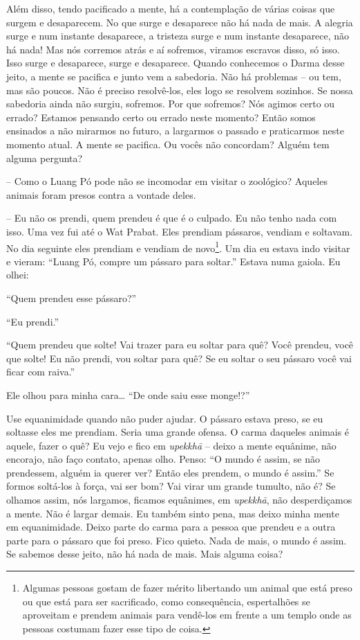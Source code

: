 Além disso, tendo pacificado a mente, há a contemplação de várias
coisas que surgem e desaparecem. No que surge e desaparece não há nada
de mais. A alegria surge e num instante desaparece, a tristeza surge e
num instante desaparece, não há nada! Mas nós corremos atrás e aí
sofremos, viramos escravos disso, só isso. Isso surge e desaparece,
surge e desaparece. Quando conhecemos o Darma desse jeito, a mente se
pacifica e junto vem a sabedoria. Não há problemas – ou tem, mas são
poucos. Não é preciso resolvê-los, eles logo se resolvem sozinhos. Se
nossa sabedoria ainda não surgiu, sofremos. Por que sofremos? Nós
agimos certo ou errado? Estamos pensando certo ou errado neste momento?
Então somos ensinados a não mirarmos no futuro, a largarmos o passado e
praticarmos neste momento atual. A mente se pacifica. Ou vocês não
concordam? Alguém tem alguma pergunta?

-- Como o Luang Pó pode não se incomodar em visitar o zoológico?
Aqueles animais foram presos contra a vontade deles.

-- Eu não os prendi, quem prendeu é que é o culpado. Eu não tenho
nada com isso. Uma vez fui até o Wat Prabat. Eles prendiam pássaros,
vendiam e soltavam. No dia seguinte eles prendiam e vendiam de
novo\footnote{Algumas pessoas gostam de fazer mérito libertando um
animal que está preso ou que está para ser sacrificado, como
consequência, espertalhões se aproveitam e prendem animais para
vendê-los em frente a um templo onde as pessoas costumam fazer esse
tipo de coisa.}. Um dia eu estava indo visitar e vieram: “Luang Pó,
compre um pássaro para soltar.” Estava numa gaiola. Eu olhei:

“Quem prendeu esse pássaro?”

“Eu prendi.”

“Quem prendeu que solte! Vai trazer para eu soltar para quê? Você
prendeu, você que solte! Eu não prendi, vou soltar para quê? Se eu
soltar o seu pássaro você vai ficar com raiva.”

Ele olhou para minha cara… “De onde saiu esse monge!?” 

Use equanimidade quando não puder ajudar. O pássaro estava preso, se
eu soltasse eles me prendiam. Seria uma grande ofensa. O carma daqueles
animais é aquele, fazer o quê? Eu vejo e fico em \textit{upekkhā} –
deixo a mente equânime, não encorajo, não faço contato, apenas olho.
Penso: “O mundo é assim, se não prendessem, alguém ia querer ver? Então
eles prendem, o mundo é assim.” Se formos soltá-los à força, vai ser
bom? Vai virar um grande tumulto, não é? Se olhamos assim, nós
largamos, ficamos equânimes, em \textit{upekkhā}, não desperdiçamos a
mente. Não é largar demais. Eu também sinto pena, mas deixo minha mente
em equanimidade. Deixo parte do carma para a pessoa que prendeu e a
outra parte para o pássaro que foi preso. Fico quieto. Nada de mais, o
mundo é assim. Se sabemos desse jeito, não há nada de mais. Mais alguma
coisa?

